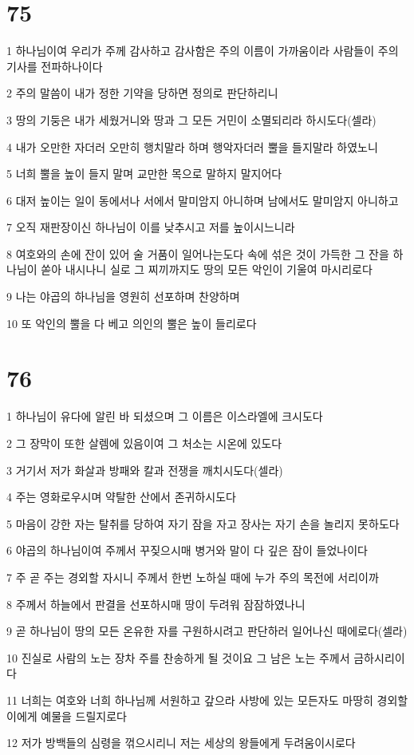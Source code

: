 \chapter{75}

\par 1 하나님이여 우리가 주께 감사하고 감사함은 주의 이름이 가까움이라 사람들이 주의 기사를 전파하나이다
\par 2 주의 말씀이 내가 정한 기약을 당하면 정의로 판단하리니
\par 3 땅의 기둥은 내가 세웠거니와 땅과 그 모든 거민이 소멸되리라 하시도다(셀라)
\par 4 내가 오만한 자더러 오만히 행치말라 하며 행악자더러 뿔을 들지말라 하였노니
\par 5 너희 뿔을 높이 들지 말며 교만한 목으로 말하지 말지어다
\par 6 대저 높이는 일이 동에서나 서에서 말미암지 아니하며 남에서도 말미암지 아니하고
\par 7 오직 재판장이신 하나님이 이를 낮추시고 저를 높이시느니라
\par 8 여호와의 손에 잔이 있어 술 거품이 일어나는도다 속에 섞은 것이 가득한 그 잔을 하나님이 쏟아 내시나니 실로 그 찌끼까지도 땅의 모든 악인이 기울여 마시리로다
\par 9 나는 야곱의 하나님을 영원히 선포하며 찬양하며
\par 10 또 악인의 뿔을 다 베고 의인의 뿔은 높이 들리로다

\chapter{76}

\par 1 하나님이 유다에 알린 바 되셨으며 그 이름은 이스라엘에 크시도다
\par 2 그 장막이 또한 살렘에 있음이여 그 처소는 시온에 있도다
\par 3 거기서 저가 화살과 방패와 칼과 전쟁을 깨치시도다(셀라)
\par 4 주는 영화로우시며 약탈한 산에서 존귀하시도다
\par 5 마음이 강한 자는 탈취를 당하여 자기 잠을 자고 장사는 자기 손을 놀리지 못하도다
\par 6 야곱의 하나님이여 주께서 꾸짖으시매 병거와 말이 다 깊은 잠이 들었나이다
\par 7 주 곧 주는 경외할 자시니 주께서 한번 노하실 때에 누가 주의 목전에 서리이까
\par 8 주께서 하늘에서 판결을 선포하시매 땅이 두려워 잠잠하였나니
\par 9 곧 하나님이 땅의 모든 온유한 자를 구원하시려고 판단하러 일어나신 때에로다(셀라)
\par 10 진실로 사람의 노는 장차 주를 찬송하게 될 것이요 그 남은 노는 주께서 금하시리이다
\par 11 너희는 여호와 너희 하나님께 서원하고 갚으라 사방에 있는 모든자도 마땅히 경외할 이에게 예물을 드릴지로다
\par 12 저가 방백들의 심령을 꺾으시리니 저는 세상의 왕들에게 두려움이시로다

